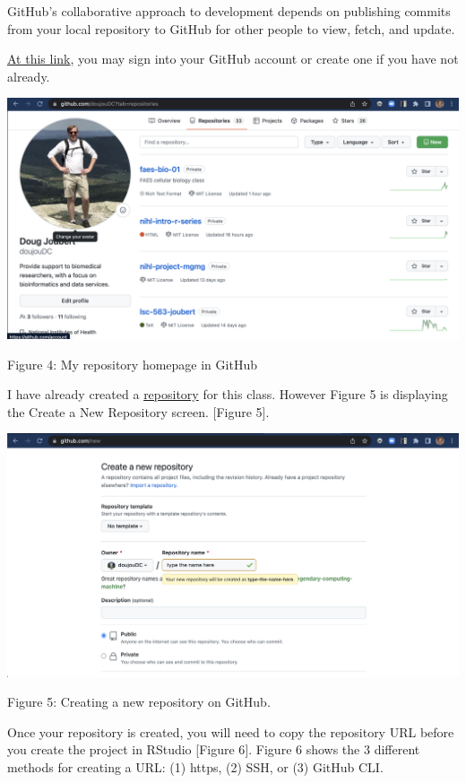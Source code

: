 \documentclass[
]{article}
\begin{document}
GitHub's collaborative approach to development depends on publishing
commits from your local repository to GitHub for other people to view,
fetch, and update.

\href{https://github.com/signup}{At this link}, you may sign into your
GitHub account or create one if you have not already.

\includegraphics[width=6.5in,height=\textheight]{images/git-hub-01.png}

Figure 4: My repository homepage in GitHub

I have already created a
\href{https://github.com/doujouDC/nihl-intro-r-series.git}{repository}
for this class. However Figure 5 is displaying the Create a New
Repository screen. {[}Figure 5{]}.

\includegraphics[width=6.5in,height=\textheight]{images/git-hub-02.png}

Figure 5: Creating a new repository on GitHub.

Once your repository is created, you will need to copy the repository
URL before you create the project in RStudio {[}Figure 6{]}. Figure 6
shows the 3 different methods for creating a URL: (1) https, (2) SSH, or
(3) GitHub CLI.
\end{document}
